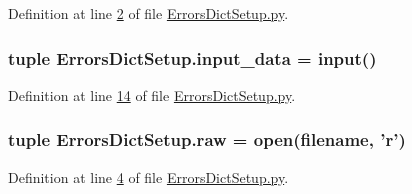 Definition at line \hyperlink{_errors_dict_setup_8py_source_l00002}{2} of file \hyperlink{_errors_dict_setup_8py_source}{Errors\-Dict\-Setup.\-py}.

\hypertarget{namespace_errors_dict_setup_a27081bed64a1fae4487e33cd53862a6f}{
\subsubsection[{input\-\_\-data}]{\setlength{\rightskip}{0pt plus 5cm}tuple Errors\-Dict\-Setup.\-input\-\_\-data = input()}}\label{namespace_errors_dict_setup_a27081bed64a1fae4487e33cd53862a6f}


Definition at line \hyperlink{_errors_dict_setup_8py_source_l00014}{14} of file \hyperlink{_errors_dict_setup_8py_source}{Errors\-Dict\-Setup.\-py}.

\hypertarget{namespace_errors_dict_setup_ad08a9cc68898a62eb6523550f54917cf}{
\subsubsection[{raw}]{\setlength{\rightskip}{0pt plus 5cm}tuple Errors\-Dict\-Setup.\-raw = open({\bf filename}, 'r')}}\label{namespace_errors_dict_setup_ad08a9cc68898a62eb6523550f54917cf}


Definition at line \hyperlink{_errors_dict_setup_8py_source_l00004}{4} of file \hyperlink{_errors_dict_setup_8py_source}{Errors\-Dict\-Setup.\-py}.

